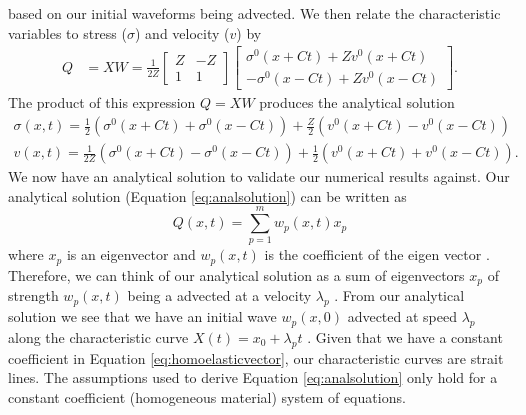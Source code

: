\documentclass[review,onefignum,onetabnum]{siamart171218}
\begin{document}
based on our initial waveforms being advected. We then relate the characteristic variables to stress ($\sigma$) and velocity ($v$) by 
\begin{align}
    Q &= XW = \frac{1}{2Z} \begin{bmatrix} Z & -Z \\ 1 & 1\end{bmatrix} \begin{bmatrix} \sigma^0(x+Ct) + Zv^0(x+Ct)\\ -\sigma^0(x-Ct) + Zv^0(x-Ct)\end{bmatrix}.
\end{align}
The product of this expression $Q = XW$ produces the analytical solution
\begin{equation}
\begin{gathered}
    \sigma(x,t) = \frac{1}{2} (\sigma^0(x+Ct) + \sigma^0(x-Ct)) + \frac{Z}{2} (v^0(x+Ct) - v^0(x-Ct)) \\ 
    v(x,t) = \frac{1}{2Z}(\sigma^0(x+Ct) - \sigma^0(x-Ct)) + \frac{1}{2}(v^0(x+Ct) + v^0(x-Ct)).
    \label{eq:analsolution}
\end{gathered}
\end{equation}
We now have an analytical solution to validate our numerical results against. Our analytical solution (Equation \ref{eq:analsolution}) can be written as 
\begin{equation}
    Q(x,t) = \sum_{p=1}^{m} w_p(x,t)x_p
    \label{eq:summation}
\end{equation}
where $x_p$ is an eigenvector and $w_p(x,t)$ is the coefficient of the eigen vector \cite{comp_seis, leveque_2002}. Therefore, we can think of our analytical solution as a sum of eigenvectors $x_p$ of strength $w_p(x,t)$ being a advected at a velocity $\lambda_p$ \cite{leveque_2002}. From our analytical solution we see that we have an initial wave $w_p(x,0)$ advected at speed $\lambda_p$ along the characteristic curve $X(t) = x_0 + \lambda_p t$ \cite{leveque_2002}. Given that we have a constant coefficient in Equation \ref{eq:homoelasticvector}, our characteristic curves are strait lines. The assumptions used to derive Equation \ref{eq:analsolution} only hold for a constant coefficient (homogeneous material) system of equations. 
\end{document}

